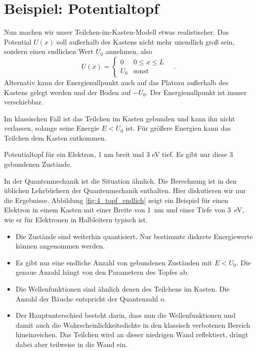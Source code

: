 \section{Beispiel: Potentialtopf}

Nun machen wir unser Teilchen-im-Kasten-Modell etwas realistischer. Das Potential $U(x)$ soll außerhalb des Kastens nicht mehr unendlich groß sein, sondern einen endlichen Wert $U_0$ annehmen, also
\begin{equation}
    U(x) = \left\{ 
        \begin{matrix}
            0 & 0 \le x \le L \\
            U_0 & \text{sonst}
        \end{matrix}
    \right. \quad .
\end{equation}
Alternativ kann der Energienullpunkt auch auf das Plateau außerhalb des Kastens gelegt werden und der Boden auf $-U_0$. Der Energienullpunkt ist immer verschiebbar.

Im klassischen Fall ist das Teilchen im Kasten gebunden und kann ihn nicht verlassen, solange seine Energie $E < U_0$ ist. Für größere Energien kann das Teilchen dem Kasten entkommen.

\begin{marginfigure}
    \caption{Potentialtopf für ein Elektron, 1 nm breit und 3 eV tief. Es gibt nur diese 3 gebundenen Zustände.}
    \label{fig:4_topf_endlich}
\end{marginfigure}

In der Quantenmechanik ist die Situation ähnlich.  Die Berechnung ist in den üblichen Lehrbüchern der Quantenmechanik enthalten. Hier diskutieren wir nur die Ergebnisse. Abbildung  \ref{fig:4_topf_endlich} zeigt ein Beispiel für einen Elektron in einem Kasten mit einer Breite von 1~nm und einer Tiefe von 3~eV, wie er für Elektronen in Halbleitern typisch ist.
\begin{itemize}\setlength{\itemsep}{0pt}
    \item Die Zustände sind weiterhin quantisiert. Nur bestimmte diskrete Energiewerte können angenommen werden.
    \item Es gibt nur eine endliche Anzahl von gebundenen Zuständen mit $E < U_0$. Die genaue Anzahl hängt von den Parametern des Topfes ab.
    \item Die Wellenfunktionen sind ähnlich denen des Teilchens im Kasten. Die Anzahl der Bäuche entspricht der Quantenzahl $n$.
    \item Der Hauptunterschied besteht darin, dass nun die Wellenfunktionen und damit auch die Wahrscheinlichkeitsdichte in den klassisch verbotenen Bereich hineinreichen. Das Teilchen wird an dieser niedrigen Wand reflektiert, dringt dabei aber teilweise in die Wand ein.
\end{itemize}

